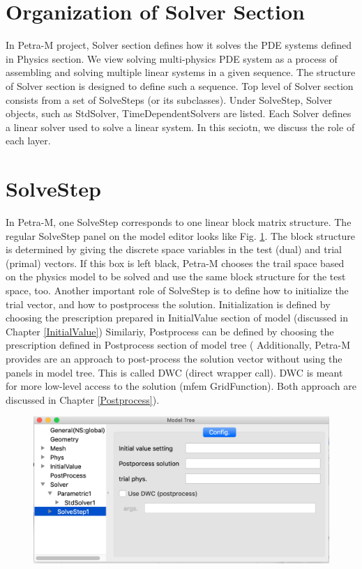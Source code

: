 \documentclass[11pt,a4paper,final]{report}
\begin{document}
\section{Organization of Solver Section}
In Petra-M project, Solver section defines how it solves the PDE systems defined in Physics section. 
We view solving multi-physics PDE system as a process of assembling and solving multiple linear systems in a given sequence. 
The structure of Solver section is designed to define such a sequence. 
Top level of Solver section consists from a set of SolveSteps (or its subclasses). 
Under SolveStep, Solver objects, such as StdSolver, TimeDependentSolvers are listed. 
Each Solver defines a linear solver used to solve a linear system. 
In this seciotn, we discuss the role of each layer. 

\section{SolveStep}
In Petra-M, one SolveStep corresponds to one linear block matrix structure. 
The regular SolveStep panel on the model editor looks like Fig. \ref{solve_step}.
The block structure is determined by giving the discrete space variables in the test (dual) and trial  (primal) vectors. 
If this box is left black, Petra-M chooses the trail space based on the physics model to be solved and use the same block structure for the test space, too.
Another important role of SolveStep is to define how to initialize the trial vector, and how to postprocess the solution.
Initialization is defined by choosing the prescription prepared in InitialValue section of model (discussed in Chapter \ref{InitialValue})
Similariy, Postprocess can be defined by choosing the prescription defined in Postprocess section of model tree (
Additionally, Petra-M provides are an approach to post-process the solution vector without using the panels in model tree. This is called DWC (direct wrapper call).
DWC is meant for more low-level access to the solution (mfem GridFunction). 
Both approach are discussed in Chapter \ref{Postprocess}). 

\begin{figure}
\centering
\includegraphics[width=0.95\columnwidth]{figures/solve_step.png} 
\caption{  }\label{solve_step}
\end{figure}
\end{document}
